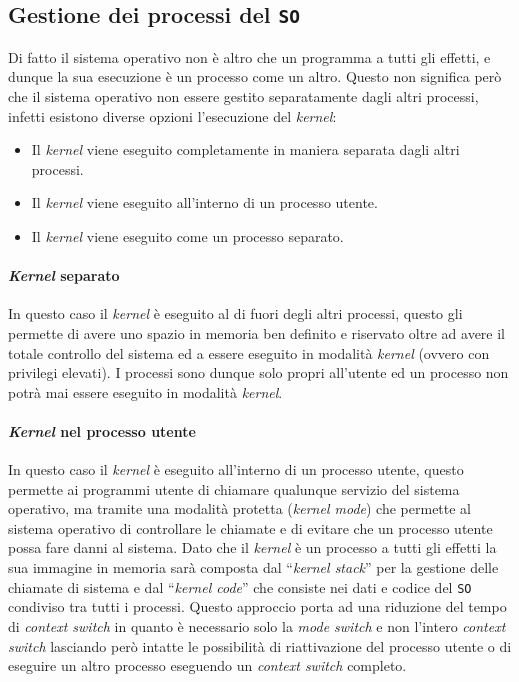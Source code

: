     \subsection{Gestione dei processi del \texttt{SO}}
        Di fatto il sistema operativo non è altro che un programma a tutti gli effetti, e dunque la sua esecuzione è un processo come un altro. Questo non significa però che il sistema operativo non essere gestito separatamente dagli altri processi, infetti esistono diverse opzioni l'esecuzione del \textit{kernel}:
        \begin{itemize}
            \item Il \textit{kernel} viene eseguito completamente in maniera separata dagli altri processi.
            \item Il \textit{kernel} viene eseguito all'interno di un processo utente.
            \item Il \textit{kernel} viene eseguito come un processo separato.
        \end{itemize}
        \paragraph{\textit{Kernel} separato} In questo caso il \textit{kernel} è eseguito al di fuori degli altri processi, questo gli permette di avere uno spazio in memoria ben definito e riservato oltre ad avere il totale controllo del sistema ed a essere eseguito in modalità \textit{kernel} (ovvero con privilegi elevati). I processi sono dunque solo propri all'utente ed un processo non potrà mai essere eseguito in modalità \textit{kernel}.
        \paragraph{\textit{Kernel} nel processo utente} In questo caso il \textit{kernel} è eseguito all'interno di un processo utente, questo permette ai programmi utente di chiamare qualunque servizio del sistema operativo, ma tramite una modalità protetta (\textit{kernel mode}) che permette al sistema operativo di controllare le chiamate e di evitare che un processo utente possa fare danni al sistema. Dato che il \textit{kernel} è un processo a tutti gli effetti la sua immagine in memoria sarà composta dal ``\textit{kernel stack}'' per la gestione delle chiamate di sistema e dal ``\textit{kernel code}'' che consiste nei dati e codice del \texttt{SO} condiviso tra tutti i processi.\newline
        Questo approccio porta ad una riduzione del tempo di \textit{context switch} in quanto è necessario solo la \textit{mode switch} e non l'intero \textit{context switch} lasciando però intatte le possibilità di riattivazione del processo utente o di eseguire un altro processo eseguendo un \textit{context switch} completo.
